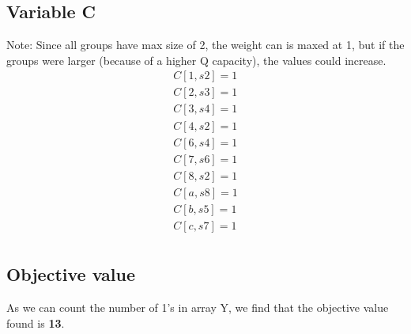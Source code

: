 \subsection{Variable C}

Note: Since all groups have max size of 2, the weight can is maxed at 1, but if the groups were larger (because of a higher Q capacity), the values could increase. \\

\begin{align*}
C[1,s2] = 1 \\
C[2,s3] = 1 \\
C[3,s4] = 1 \\
C[4,s2] = 1 \\
C[6,s4] = 1 \\
C[7,s6] = 1 \\
C[8,s2] = 1 \\
C[a,s8] = 1 \\
C[b,s5] = 1 \\
C[c,s7] = 1 \\
\end{align*}

\subsection{Objective value}

As we can count the number of 1's in array Y, we find that the objective value found is \textbf{13}. 